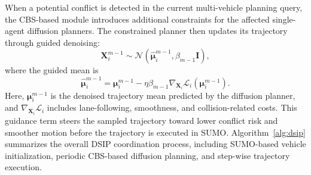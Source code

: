 \documentclass[journal]{IEEEtran}
\begin{document}
When a potential conflict is detected in the current multi-vehicle planning query, the CBS-based module introduces additional constraints for the affected single-agent diffusion planners. The constrained planner then updates its trajectory through guided denoising:
\begin{equation}
\mathbf{X}_i^{m-1}
\sim
\mathcal{N}
\left(
\widehat{\boldsymbol{\mu}}_{i}^{m-1},
\beta_{m-1}\mathbf{I}
\right),
\label{eq_guided_sampling_control}
\end{equation}
where the guided mean is
\begin{equation}
\widehat{\boldsymbol{\mu}}_{i}^{m-1}
=
\boldsymbol{\mu}_{i}^{m-1}
-
\eta\beta_{m-1}
\nabla_{\mathbf{X}_i}
\mathcal{L}_i(\boldsymbol{\mu}_{i}^{m-1}).
\label{eq_guided_mean_control}
\end{equation}
Here, $\boldsymbol{\mu}_{i}^{m-1}$ is the denoised trajectory mean predicted by the diffusion planner, and $\nabla_{\mathbf{X}_i}\mathcal{L}_i$ includes lane-following, smoothness, and collision-related costs. This guidance term steers the sampled trajectory toward lower conflict risk and smoother motion before the trajectory is executed in SUMO. Algorithm~\ref{alg:dsip} summarizes the overall DSIP coordination process, including SUMO-based vehicle initialization, periodic CBS-based diffusion planning, and step-wise trajectory execution.
\end{document}
